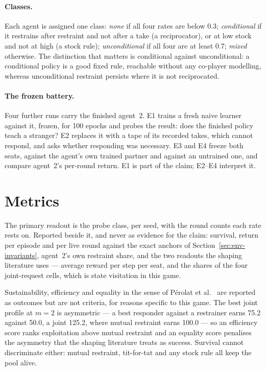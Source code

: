 \paragraph{Classes.}
Each agent is assigned one class: \emph{none} if all four rates are below
0.3; \emph{conditional} if it restrains after restraint and not after a take
(a reciprocator), or at low stock and not at high (a stock rule);
\emph{unconditional} if all four are at least 0.7; \emph{mixed} otherwise.
The distinction that matters is conditional against unconditional: a
conditional policy is a good fixed rule, reachable without any co-player
modelling, whereas unconditional restraint persists where it is not
reciprocated.

\paragraph{The frozen battery.}
Four further runs carry the finished agent~2.
E1 trains a fresh naive learner against it, frozen, for 100 epochs and probes
the result: does the finished policy teach a stranger?
E2 replaces it with a tape of its recorded takes, which cannot respond, and
asks whether responding was necessary.
E3 and E4 freeze both seats, against the agent's own trained partner and
against an untrained one, and compare agent~2's per-round return.
E1 is part of the claim; E2--E4 interpret it.

\section{Metrics}
\label{sec:method-metrics}

The primary readout is the probe class, per seed, with the round counts each
rate rests on.
Reported beside it, and never as evidence for the claim: survival, return
per episode and per live round against the exact anchors of
Section~\ref{sec:env-invariants}, agent~2's own restraint share, and the two
readouts the shaping literature uses --- average reward per step per seat,
and the shares of the four joint-request cells, which is state visitation in
this game.

Sustainability, efficiency and equality in the sense of P\'erolat et al.\
\cite{perolat2017} are reported as outcomes but are not criteria, for
reasons specific to this game.
The best joint profile at \(m=2\) is asymmetric --- a best responder against a
restrainer earns 75.2 against 50.0, a joint 125.2, where mutual restraint
earns 100.0 --- so an efficiency score ranks exploitation above mutual
restraint and an equality score penalises the asymmetry that the shaping
literature treats as success.
Survival cannot discriminate either: mutual restraint, tit-for-tat and any
stock rule all keep the pool alive.

